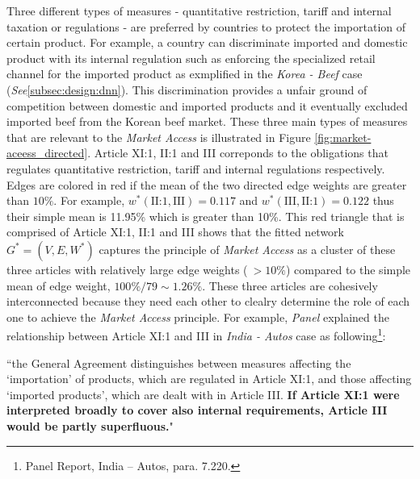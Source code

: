 Three different types of measures - quantitative restriction, tariff and internal taxation or regulations - are preferred by countries to protect the importation of certain product. For example, a country can
discriminate imported and domestic product with its internal regulation such as enforcing the specialized retail channel for the imported product as exmplified in the \textit{Korea - Beef} case (\textit{See}\ref{subsec:design:dnn}).
This discrimination provides a unfair ground of competition between domestic and imported products and it eventually excluded imported beef from the Korean beef market.
These three main types of measures that are relevant to the \textit{Market Access} is illustrated in Figure \ref{fig:market-aceess_directed}.
Article XI:1, II:1 and III correponds to the obligations that regulates quantitative restriction, tariff and internal regulations respectively.
Edges are colored in red if the mean of the two directed edge weights are greater than $10\%$. For example, $w^*(\text{II:1}, \text{III}) = 0.117$ and $w^*(\text{III}, \text{II:1}) = 0.122$ thus their simple mean is 11.95\% which is greater than 10\%.
This red triangle that is comprised of Article XI:1, II:1 and III shows that the fitted network $G^* = (V, E, W^*)$ captures the principle of \textit{Market Access} as a cluster of these three articles with relatively large edge weights ($\: >10\%$) compared to the simple mean of edge weight, $100\% / 79 \sim 1.26\%$. 
These three articles are cohesively interconnected because they need each other to clealry determine the role of each one to achieve the \textit{Market Access} principle.
For example, \textit{Panel} explained the relationship between Article XI:1 and III in \textit{India - Autos} case as following\footnote{Panel Report, India – Autos, para. 7.220.}:

\begin{displayquote}[][]
``the General Agreement distinguishes between measures affecting the `importation' of products,
which are regulated in Article XI:1, and those affecting `imported products', which are dealt with in
Article III. \textbf{If Article XI:1 were interpreted broadly to cover also internal requirements, Article III
would be partly superfluous.}"
\end{displayquote}




